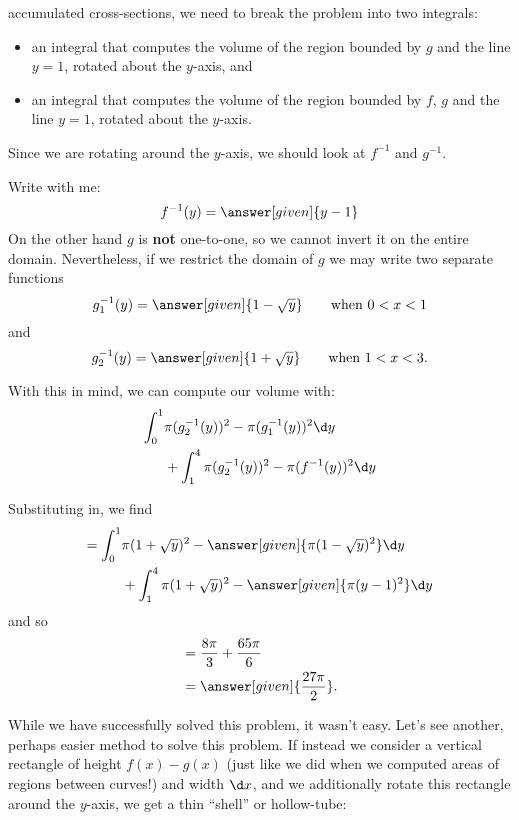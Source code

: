 \documentclass{ximera}
\begin{document}
accumulated cross-sections, we need to break the problem into two
integrals:
\begin{itemize}
  \item an integral that computes the volume of the region bounded by
    $g$ and the line $y=1$, rotated about the $y$-axis, and
  \item an integral that computes the volume of the region bounded by
    $f$, $g$ and the line $y=1$, rotated about the $y$-axis.
\end{itemize}
Since we are rotating around the $y$-axis, we should look at $f^{-1}$
and $g^{-1}$.
\begin{explanation}
  Write with me:
  \[
  f^{-1}(y) = \answer[given]{y-1}
  \]
  On the other hand $g$ is \textbf{not} one-to-one, so
  we cannot invert it on the entire domain. Nevertheless, if we restrict
  the domain of $g$ we may write two separate functions
  \[
  g^{-1}_1(y) = \answer[given]{1-\sqrt{y}}\qquad\text{when $0<x<1$}
  \]
  and
  \[
  g^{-1}_2(y) = \answer[given]{1+\sqrt{y}}\qquad\text{when $1<x<3$}.
  \]
\end{explanation}
With this in mind, we can compute our volume with:
\begin{align*}
  \int_0^1 &\pi(g^{-1}_2(y))^2-\pi(g_1^{-1}(y))^2\d y\\
  &+ \int_1^4\pi(g^{-1}_2(y))^2-\pi(f^{-1}(y))^2\d y
\end{align*}
\begin{explanation}
Substituting in, we find
  \begin{align*}
    =\int_0^1 &\pi(1+\sqrt{y})^2-\answer[given]{\pi(1-\sqrt{y})^2}\d y\\
    &+ \int_1^4  \pi(1+\sqrt{y})^2-\answer[given]{\pi(y-1)^2}\d y
  \end{align*}
  and so
  \begin{align*}
  &=\frac{8\pi}{3} + \frac{65\pi}{6}\\
  &=\answer[given]{\frac{27\pi}{2}}.
  \end{align*}
\end{explanation}
While we have successfully solved this problem, it wasn't easy. Let's
see another, perhaps easier method to solve this problem.  If instead
we consider a vertical rectangle of height $f(x)-g(x)$ (just like we
did when we computed areas of regions between curves!)  and width $\d
x$, and we additionally rotate this rectangle around the $y$-axis, we
get a thin ``shell'' or hollow-tube:
\end{document}
